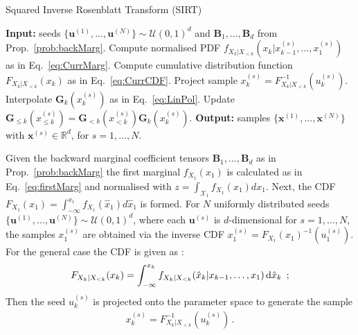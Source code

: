 \begin{algorithm}[!th]
	\caption{Squared Inverse Rosenblatt Transform (SIRT)}
	\begin{algorithmic}[1]
		\STATE \textbf{Input:} seeds $\{ \bm{u}^{(1)},\dots, \bm{u}^{(N)} \} \sim \mathcal{U}(0,1)^d $ and $\bm{B}_1 , \dots,\bm{B}_d$ from Prop.~\ref{prob:backMarg}.
		\STATE Compute normalised PDF $ f_{X_k|X_{<k}}(x_k|x^{(s)}_{k-1},\dots,x^{(s)}_1)$ as in Eq.~\ref{eq:CurrMarg}.
		\STATE Compute cumulative distribution function $F_{X_k|X_{<k}}(x_k)$ as in Eq.~\ref{eq:CurrCDF}.
		\STATE Project sample $x^{(s)}_k = F_{X_k|X_{<k}}^{-1}(u^{(s)}_k)$.
		\STATE Interpolate $\bm{G}_k(x^{(s)}_k)$ as in Eq.~\ref{eq:LinPol}.
		\STATE Update $\bm{G}_{\leq k}(x^{(s)}_{\leq k}) = \bm{G}_{<k}(x^{(s)}_{<k}) \bm{G}_k(x^{(s)}_k)$.
		\ENDFOR
		\ENDFOR
		\STATE \textbf{Output:} samples $\{ \bm{x}^{(1)},\dots, \bm{x}^{(N)} \} $ with $\bm{x}^{(s)} \in \mathbb{R}^d$, for $s = 1, \dots, N$.
	\end{algorithmic}
	\label{alg:SIRT}
\end{algorithm}
Given the backward marginal coefficient tensors $\bm{B}_1 , \dots,\bm{B}_d$ as in Prop.~\ref{prob:backMarg} the first marginal $f_{X_1}(x_1)$ is calculated as in Eq.~\ref{eq:firstMarg} and normalised with $z = \int_{\mathcal{X}_1} f_{X_1}(x_1) d x_1$. 
Next, the CDF $F_{X_1}(x_1) = \int^{x_1}_{-\infty} f_{X_1}(\hat{x}_1) d \hat{x}_1$ is formed.
For $N$ uniformly distributed seeds $\{ \bm{u}^{(1)},\dots, \bm{u}^{(N)} \} \sim \mathcal{U}(0,1)^d $, where each $\bm{u}^{(s)}$ is $d$-dimensional for $s = 1, \dots, N$, the samples $x^{(s)}_1 $ are obtained via the inverse CDF $x^{(s)}_1 = F_{X_1}(x_1)^{-1}(u^{(s)}_1)$.
For the general case the CDF is given as \cite[Eq. 17]{cui2022deep}:
\begin{align}
	F_{X_k|X_{<k}}(x_k) = \int_{-\infty}^{x_k} f_{X_k|X_{<k}}(\hat{x}_k|x_{k-1},\dots,x_1) \mathop{}\!\mathrm{d} \hat{x}_k  \, \,  \, ;
	\label{eq:CurrCDF}
\end{align}
Then the seed $u^{(s)}_k$ is projected onto the parameter space to generate the sample 
\begin{align}
x^{(s)}_k = F_{X_k|X_{<k}}^{-1}(u^{(s)}_k) \, . \label{eq:IRTmap}
\end{align} %
